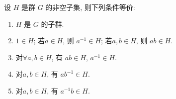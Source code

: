 \documentclass[../../main.tex]{subfiles}%
\begin{document}
\begin{theorem}\label{theorem:子群的充要条件--抽象代数}
设 \( H \) 是群 \( G \) 的非空子集, 则下列条件等价:
\begin{enumerate}[(1)]
\item\label{theorem:子群的充要条件--抽象代数-1} \( H \) 是 \( G \) 的子群.

\item\label{theorem:子群的充要条件--抽象代数-2} \( 1 \in H \); 若\( a \in H \), 则 \( a^{-1} \in H \); 若\( a, b \in H \), 则 \( ab \in H \).

\item\label{theorem:子群的充要条件--抽象代数-3} 对\(\forall a, b \in H \), 有 \( ab \in H \), \( a^{-1} \in H \).

\item\label{theorem:子群的充要条件--抽象代数-4} 对\( a, b \in H \), 有 \( ab^{-1} \in H \).

\item\label{theorem:子群的充要条件--抽象代数-5} 对\( a, b \in H \), 有 \( a^{-1}b \in H \).
\end{enumerate}
\end{theorem}
\end{document}
